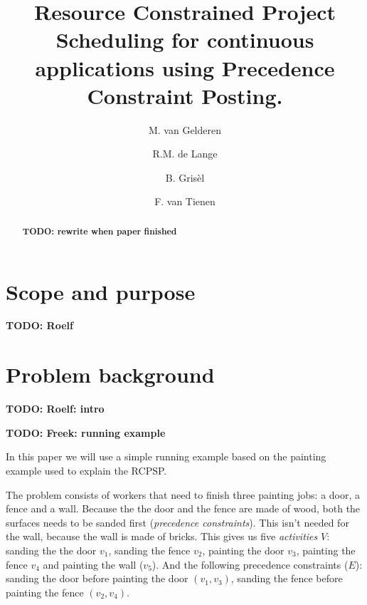 \documentclass{article}
\title{Resource Constrained Project Scheduling for continuous applications using Precedence Constraint Posting.}
\author{M. van Gelderen  \and
    R.M. de Lange \and
    B. Gris\`el \and
    F. van Tienen}
\date{}
\newcommand{\TODO}[1]{{\color{red}\textbf{TODO: #1}}}
\begin{document}
\maketitle
\thispagestyle{empty}

\begin{abstract}
\TODO{rewrite when paper finished}
\end{abstract}


\newpage


\section{Scope and purpose}

\TODO{Roelf}


\newpage


\section{Problem background}

\TODO{Roelf: intro}

\TODO{Freek: running example}

In this paper we will use a simple running example based on the painting example used to explain the RCPSP.

The problem consists of workers that need to finish three painting jobs: a door, a fence and a wall.
Because the the door and the fence are made of wood, both the surfaces needs to be sanded first (\emph{precedence constraints}).
This isn't needed for the wall, because the wall is made of bricks.
This gives us five \emph{activities} $V$: sanding the the door $v_1$, sanding the fence $v_2$,  painting the door $v_3$, painting the fence $v_4$ and painting the wall ($v_5$). And the following precedence constraints ($E$): sanding the door before painting the door $(v_1, v_3)$, sanding the fence before painting the fence $(v_2, v_4)$.
\end{document}
